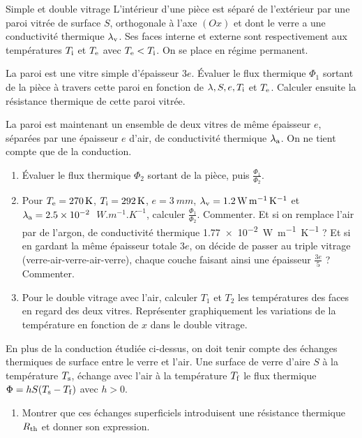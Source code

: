\begin{exo}[PC]{Simple et double vitrage}
L'intérieur d'une pièce est séparé de l'extérieur par une paroi vitrée de surface $S$, orthogonale à l'axe $(Ox)$ et dont le verre a une conductivité thermique $\lambda_{\rm{v}}$. Ses faces interne et externe sont respectivement aux températures $T_{\rm{i}}$ et $T_{\rm{e}}$ avec $T_{\rm{e}}<T_{\rm{i}}$. On se place en régime permanent.

\begin{quest}
\item La paroi est une vitre simple d'épaisseur $3e$. Évaluer le flux thermique $\Phi_{1}$ sortant de la pièce à travers cette paroi en fonction de $\lambda,S,e,T_{\rm{i}}$ et $T_{\rm{e}}$. Calculer ensuite la résistance thermique de cette paroi vitrée.
\item La paroi est maintenant un ensemble de deux vitres de même épaisseur $e$, séparées par une épaisseur $e$ d'air, de conductivité thermique $\lambda_{\rm{a}}$. On ne tient compte que de la conduction.
\begin{enumerate}
\item Évaluer le flux thermique $\Phi_2$ sortant de la pièce, puis $\frac{\Phi_1}{\Phi_2}$.
\item Pour $T_{\rm{e}}=\SI{270}{K}$, $T_{\rm{i}}=\SI{292}{K}$, $e=\SI{3}{mm}$, $\lambda_{\rm{v}}=\SI{1,2}{W.m^{-1}.K^{-1}}$ et $\lambda_{\rm{a}}=\SI{2,5e-2}{}$ $\SI{}{W.m^{-1}.K^{-1}}$, calculer $\frac{\Phi_1}{\Phi_2}$. Commenter.
Et si on remplace l'air par de l'argon, de conductivité thermique \SI{1,77e-2}{W.m^{-1}.K^{-1}} ?  Et si en gardant la même épaisseur totale $3e$, on décide de passer au triple vitrage (verre-air-verre-air-verre), chaque couche faisant ainsi une épaisseur $\frac{3e}{5}$ ? Commenter.
\item Pour le double vitrage avec l'air, calculer $T_1$ et $T_2$ les températures des faces en regard des deux vitres. Représenter graphiquement les variations de la température en fonction de $x$ dans le double vitrage.
\end{enumerate}
\item En plus de la conduction étudiée ci-dessus, on doit tenir compte des échanges thermiques de surface entre le verre et l'air. Une surface de verre d'aire $S$ à la température $T_{\rm{s}}$, échange avec l'air à la température $T_{\rm{f}}$ le flux thermique $\Phi=hS(T_{\rm{s}}-T_{\rm{f}})$ avec $h>0$.
\begin{enumerate}
\item Montrer que ces échanges superficiels introduisent une résistance thermique $R_{\rm{th}}$ et donner son expression.

\end{enumerate}
\end{quest}
\end{exo}
